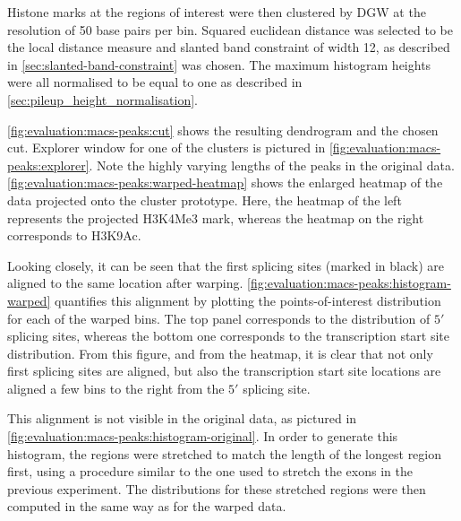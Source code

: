 \documentclass[parskip]{cs4rep}
\newcommand{\histonemodification}[1]{#1}
\begin{document}
Histone marks at the regions of interest were then clustered by DGW at the resolution of 50 base pairs per bin. Squared euclidean distance was selected to be the local distance measure and slanted band constraint of width 12, as described in \autoref{sec:slanted-band-constraint} was chosen. The maximum histogram heights were all normalised to be equal to one as described in \autoref{sec:pileup_height_normalisation}.

\autoref{fig:evaluation:macs-peaks:cut} shows the resulting dendrogram and the chosen cut. Explorer window for one of the clusters is pictured in \autoref{fig:evaluation:macs-peaks:explorer}. Note the highly varying lengths of the peaks in the original data. \autoref{fig:evaluation:macs-peaks:warped-heatmap} shows the enlarged heatmap of the data projected onto the cluster prototype. Here, the heatmap of the left represents the projected \histonemodification{H3K4Me3} mark, whereas the heatmap on the right corresponds to \histonemodification{H3K9Ac}. 

Looking closely, it can be seen that the first splicing sites (marked in black) are aligned to the same location after warping. \autoref{fig:evaluation:macs-peaks:histogram-warped} quantifies this alignment by plotting the points-of-interest distribution for each of the warped bins. The top panel corresponds to the distribution of $5'$ splicing sites, whereas the bottom one corresponds to the transcription start site distribution. From this figure, and from the heatmap, it is clear that not only first splicing sites are aligned, but also the transcription start site locations are aligned a few bins to the right from the $5'$ splicing site.

This alignment is not visible in the original data, as pictured in \autoref{fig:evaluation:macs-peaks:histogram-original}. In order to generate this histogram, the regions were stretched to match the length of the longest region first, using a procedure similar to the one used to stretch the exons in the previous experiment. The distributions for these stretched regions were then computed in the same way as for the warped data.
\end{document}
